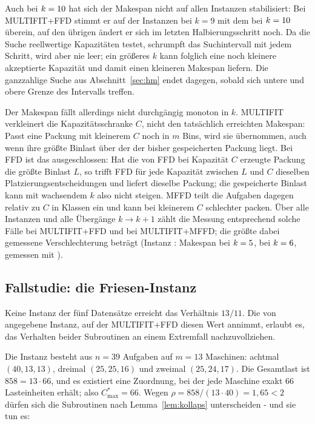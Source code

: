 Auch bei $k = 10$ hat sich der Makespan nicht auf allen Instanzen stabilisiert: Bei
MULTIFIT+FFD stimmt er auf \EvalKStabilNeun{} der Instanzen bei $k = 9$ mit dem bei
$k = 10$ überein, auf den übrigen ändert er sich im letzten Halbierungsschritt noch.
Da die Suche reellwertige Kapazitäten testet, schrumpft das Suchintervall mit jedem Schritt,
wird aber nie leer; ein größeres $k$ kann folglich eine noch kleinere akzeptierte Kapazität und
damit einen kleineren Makespan liefern.
Die ganzzahlige Suche aus Abschnitt~\ref{sec:hm} endet dagegen, sobald sich untere und obere
Grenze des Intervalls treffen.

Der Makespan fällt allerdings nicht durchgängig monoton in $k$.
MULTIFIT verkleinert die Kapazitätsschranke $C$, nicht den tatsächlich erreichten Makespan:
Passt eine Packung mit kleinerem $C$ noch in $m$ Bins, wird sie übernommen, auch wenn ihre
größte Binlast über der der bisher gespeicherten Packung liegt.
Bei FFD ist das ausgeschlossen: Hat die von FFD bei Kapazität $C$ erzeugte Packung die größte
Binlast $L$, so trifft FFD für jede Kapazität zwischen $L$ und $C$ dieselben
Platzierungsentscheidungen und liefert dieselbe Packung; die gespeicherte Binlast kann mit
wachsendem $k$ also nicht steigen.
MFFD teilt die Aufgaben dagegen relativ zu $C$ in Klassen ein und kann bei kleinerem $C$
schlechter packen.
Über alle \EvalInstanzen{} Instanzen und alle Übergänge $k \to k+1$ zählt die Messung
entsprechend \EvalKNichtMonotonFFD{} solche Fälle bei MULTIFIT+FFD und \EvalKNichtMonotonMFFD{} bei
MULTIFIT+MFFD; die größte dabei gemessene Verschlechterung beträgt \EvalKNichtMonotonMax{}
(Instanz \texttt{\EvalKNichtMonotonInstanz}: Makespan \EvalKNichtMonotonVorher{} bei
$k = 5$, \EvalKNichtMonotonNachher{} bei
$k = 6$, gemessen mit \EvalKNichtMonotonAlg).


\subsection{Fallstudie: die Friesen-Instanz}
\label{sec:friesen}

Keine Instanz der fünf Datensätze erreicht das Verhältnis $13/11$.
Die von \textcite{friesen1984} angegebene Instanz, auf der MULTIFIT+FFD diesen Wert
annimmt, erlaubt es, das Verhalten beider Subroutinen an einem Extremfall nachzuvollziehen.

Die Instanz besteht aus $n = 39$ Aufgaben auf $m = 13$ Maschinen:
achtmal $(40, 13, 13)$, dreimal $(25, 25, 16)$ und zweimal $(25, 24, 17)$.
Die Gesamtlast ist $858 = 13 \cdot 66$, und es existiert eine Zuordnung, bei der jede Maschine
exakt 66 Lasteinheiten erhält; also $C^{*}_{\max} = 66$.
Wegen $\rho = 858 / (13 \cdot 40) = 1{,}65 < 2$ dürfen sich die Subroutinen nach
Lemma~\ref{lem:kollaps} unterscheiden - und sie tun es:

